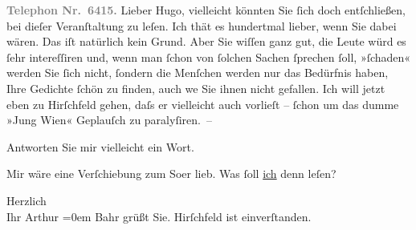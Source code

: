 \pstart
           \textcolor{gray}{\textbf{Telephon Nr. 6415.}}\pend
           \vspace{0.5em}
\pstart
           Lieber Hugo, vielleicht könnten Sie{ }ſich doch entſchließen, bei
               dieſer Veranſtaltung zu leſen. Ich thät es hundertmal lieber, wenn Sie dabei wären.
               Das iſt natürlich kein Grund. Aber Sie wiſſen ganz gut, die Leute würd es{ }ſehr
               intereſſiren {\pb}und, wenn man{ }ſchon von{ }ſolchen Sachen{ }ſprechen{ }ſoll, »ſchaden« werden Sie{ }ſich nicht,{ }ſondern die Menſchen werden nur das
               Bedürfnis haben, Ihre Gedichte{ }ſchön zu finden, auch we{\geminationn}
               Sie ihnen nicht gefallen. Ich will jetzt eben zu Hirſchfeld gehen, daſs {\pb}er vielleicht auch
               vorlieſt –{ }ſchon um das dumme »Jung Wien«
               Geplauſch zu paralyſiren. –\pend
           
\pstart
           Antworten Sie mir vielleicht ein Wort.\pend
           
\pstart
           Mir wäre eine Verſchiebung zum So{\geminationm}er lieb. Was{ }ſoll \uline{ich} denn leſen?\pend
           
\pstart
           {\pb}Herzlich{\\[\baselineskip]}Ihr \spacefill\mbox{Arthur}\pend
           \leftskip=0em{}
\pstart
           \noindent{}Bahr grüßt Sie.\pend
           \vspace{1em}
\pstart
           \noindent{}Hirſchfeld ist einverſtanden.\pend
           
